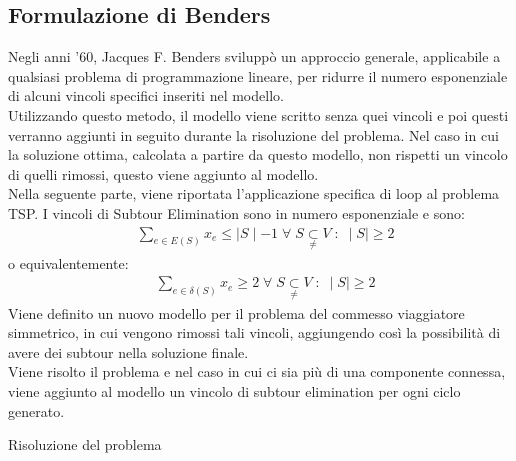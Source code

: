 \subsection{Formulazione di Benders}
Negli anni '60, Jacques F. Benders sviluppò un approccio generale, applicabile a qualsiasi problema di programmazione lineare, per ridurre il numero esponenziale di alcuni vincoli specifici inseriti nel modello.\\
Utilizzando questo metodo, il modello viene scritto senza quei vincoli e poi questi verranno aggiunti in seguito durante la risoluzione del problema. Nel caso in cui la soluzione ottima, calcolata a partire da questo modello, non rispetti un vincolo di quelli rimossi, questo viene aggiunto al modello. \\
Nella seguente parte, viene riportata l'applicazione specifica di loop al problema TSP.
I vincoli di Subtour Elimination sono in numero esponenziale e sono:\\
\begin{align}
&\underset{e\in E(S)}\sum{x_{e}} \leq \mid S\mid - 1\;\forall\;S\underset{\neq}{\subset}V\; : \; \mid S\mid\geq 2
\end{align}
o equivalentemente:
\begin{align}
&\underset{e\in \delta(S)}\sum{x_{e}}\geq 2\;\forall\;S\underset{\neq}{\subset}V\; : \; \mid S\mid\geq 2
\end{align}
Viene definito un nuovo modello per il problema del commesso viaggiatore simmetrico, in cui vengono rimossi tali vincoli, aggiungendo così la possibilità di avere dei subtour nella soluzione finale.\\
Viene risolto il problema e nel caso in cui ci sia più di una componente connessa, viene aggiunto al modello un vincolo di subtour elimination per ogni ciclo generato.\\
\begin{algorithm}
\caption{Risoluzione del problema}
\begin{algorithmic}
\STATE {}
\STATE {}
\STATE {}
\ENDIF
\STATE {}
\ENDWHILE
\end{algorithmic}
\end{algorithm}
